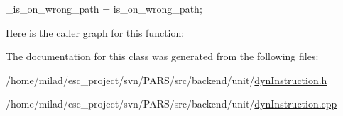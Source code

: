 \begin{DoxyCode}
                                                        {
    _is_on_wrong_path = is_on_wrong_path;
}
\end{DoxyCode}


Here is the caller graph for this function:




The documentation for this class was generated from the following files:\begin{DoxyCompactItemize}
\item 
/home/milad/esc\_\-project/svn/PARS/src/backend/unit/\hyperlink{dynInstruction_8h}{dynInstruction.h}\item 
/home/milad/esc\_\-project/svn/PARS/src/backend/unit/\hyperlink{dynInstruction_8cpp}{dynInstruction.cpp}\end{DoxyCompactItemize}
